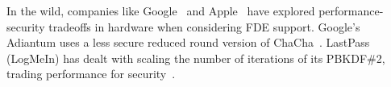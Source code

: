 In the wild, companies like Google~\cite{AndroidM} and Apple~\cite{iOSFDE} have
explored performance-security tradeoffs in hardware when considering FDE
support. Google's Adiantum uses a less secure reduced round version of
ChaCha~\cite{Adiantum}. LastPass (LogMeIn) has dealt with scaling the number of
iterations of its PBKDF\#2, trading performance for security~\cite{LastPass}. 

